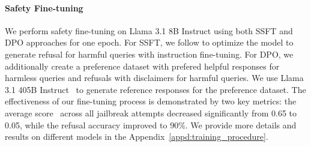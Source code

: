 \paragraph{Safety Fine-tuning}
We perform safety fine-tuning on Llama 3.1 8B Instruct using both SSFT and DPO approaches for one epoch. For SSFT, we follow \citet{inan2023llama} to optimize the model to generate refusal for harmful queries with instruction fine-tuning. For DPO, we additionally create a preference dataset with prefered helpful responses for harmless queries and refusals with disclaimers for harmful queries. We use Llama 3.1 405B Instruct~\cite{dubey2024llama} to generate reference responses for the preference dataset. The effectiveness of our fine-tuning process is demonstrated by two key metrics: the average \strongreject score~\cite{souly2024strongreject} across all jailbreak attempts decreased significantly from 0.65 to 0.05, while the refusal accuracy improved to 90\%. We provide more details and results on different models in the Appendix~\ref{appd:training_procedure}.
